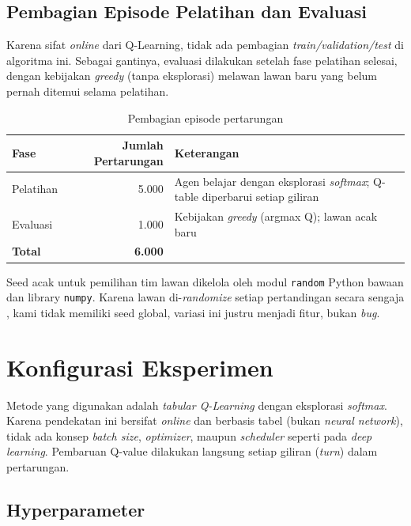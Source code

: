 \documentclass[11pt,a4paper,oneside]{report}
\begin{document}
\subsection*{Pembagian Episode Pelatihan dan Evaluasi}

Karena sifat \textit{online} dari Q-Learning, tidak ada pembagian \textit{train/validation/test} di algoritma ini. Sebagai gantinya, evaluasi dilakukan setelah fase pelatihan selesai, dengan kebijakan \textit{greedy} (tanpa eksplorasi) melawan lawan baru yang belum pernah ditemui selama pelatihan.

\begin{table}[h!]
\centering
\caption{Pembagian episode pertarungan}
\label{tab:split-data}
\begin{tabular}{lrp{7cm}}
\toprule
\textbf{Fase} & \textbf{Jumlah Pertarungan} & \textbf{Keterangan} \\
\midrule
Pelatihan  & 5.000 & Agen belajar dengan eksplorasi \textit{softmax}; Q-table diperbarui setiap giliran \\
Evaluasi   & 1.000 & Kebijakan \textit{greedy} (argmax Q); lawan acak baru \\
\midrule
\textbf{Total} & \textbf{6.000} & \\
\bottomrule
\end{tabular}
\end{table}

\noindent Seed acak untuk pemilihan tim lawan dikelola oleh modul \texttt{random} Python bawaan dan library \texttt{numpy}. Karena lawan di-\textit{randomize} setiap pertandingan secara sengaja , kami tidak memiliki seed global, variasi ini justru menjadi fitur, bukan \textit{bug}.

\section{Konfigurasi Eksperimen}

Metode yang digunakan adalah \textit{tabular Q-Learning} dengan eksplorasi \textit{softmax}. Karena pendekatan ini bersifat \textit{online} dan berbasis tabel (bukan \textit{neural network}), tidak ada konsep \textit{batch size}, \textit{optimizer}, maupun \textit{scheduler} seperti pada \textit{deep learning}. Pembaruan Q-value dilakukan langsung setiap giliran (\textit{turn}) dalam pertarungan.

\subsection*{Hyperparameter}
\end{document}
